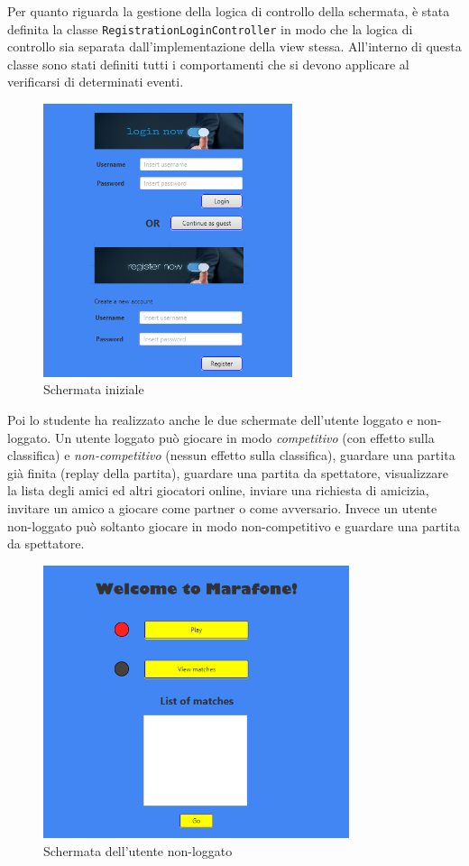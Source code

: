 Per quanto riguarda la gestione della logica di controllo della schermata, è stata definita la classe \texttt{RegistrationLoginController} in modo che la logica di controllo sia separata dall’implementazione della view stessa. All’interno di questa classe sono stati definiti tutti i comportamenti che si devono applicare al verificarsi di determinati eventi. 

\begin{figure}[h!]
 \centering
  \includegraphics[width=0.65\textwidth]{login.png}
   \caption{Schermata iniziale}
\end{figure}

Poi lo studente ha realizzato anche le due schermate dell’utente loggato e non-loggato. Un utente loggato può giocare in modo \textit{competitivo} (con effetto sulla classifica) e \textit{non-competitivo} (nessun effetto sulla classifica), guardare una partita già finita (replay della partita), guardare una partita da spettatore, visualizzare la lista degli amici ed altri giocatori online, inviare una richiesta di amicizia, invitare un amico a giocare come partner o come avversario. Invece un utente non-loggato può soltanto giocare in modo non-competitivo e guardare una partita da spettatore. 

\begin{figure}[h!]
 \centering
  \includegraphics[width=0.8\textwidth]{generic.png}
   \caption{Schermata dell'utente non-loggato }
\end{figure}

